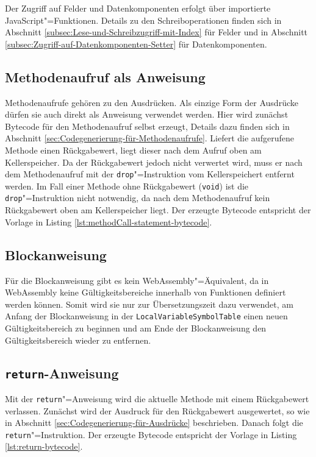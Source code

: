 \pagebreak


Der Zugriff auf Felder und Datenkomponenten erfolgt über importierte JavaScript"=Funktionen. Details zu den Schreiboperationen finden sich in Abschnitt \ref{subsec:Lese-und-Schreibzugriff-mit-Index} für Felder und in Abschnitt \ref{subsec:Zugriff-auf-Datenkomponenten-Setter} für Datenkomponenten.

\subsection{Methodenaufruf als Anweisung}
Methodenaufrufe gehören zu den Ausdrücken. Als einzige Form der Ausdrücke dürfen sie auch direkt als Anweisung verwendet werden. Hier wird zunächst Bytecode für den Methodenaufruf selbst erzeugt, Details dazu finden sich in Abschnitt \ref{sec:Codegenerierung-für-Methodenaufrufe}. Liefert die aufgerufene Methode einen Rückgabewert, liegt dieser nach dem Aufruf oben am Kellerspeicher. Da der Rückgabewert jedoch nicht verwertet wird, muss er nach dem Methodenaufruf mit der \lstinline{drop}"=Instruktion vom Kellerspeichert entfernt werden. Im Fall einer Methode ohne Rückgabewert (\lstinline{void}) ist die \lstinline{drop}"=Instruktion nicht notwendig, da nach dem Methodenaufruf kein Rückgabewert oben am Kellerspeicher liegt. Der erzeugte Bytecode entspricht der Vorlage in Listing \ref{lst:methodCall-statement-bytecode}.



\subsection{Blockanweisung}
Für die Blockanweisung gibt es kein WebAssembly"=Äquivalent, da in WebAssembly keine Gültigkeitsbereiche innerhalb von Funktionen definiert werden können. Somit wird sie nur zur Übersetzungszeit dazu verwendet, am Anfang der Blockanweisung in der \lstinline{LocalVariableSymbolTable} einen neuen Gültigkeitsbereich zu beginnen und am Ende der Blockanweisung den Gültigkeitsbereich wieder zu entfernen.

\subsection{\lstinline{return}-Anweisung}
Mit der \lstinline{return}"=Anweisung wird die aktuelle Methode mit einem Rückgabewert verlassen. Zunächst wird der Ausdruck für den Rückgabewert ausgewertet, so wie in Abschnitt \ref{sec:Codegenerierung-für-Ausdrücke} beschrieben. Danach folgt die \lstinline{return}"=Instruktion. Der erzeugte Bytecode entspricht der Vorlage in Listing \ref{lst:return-bytecode}.

